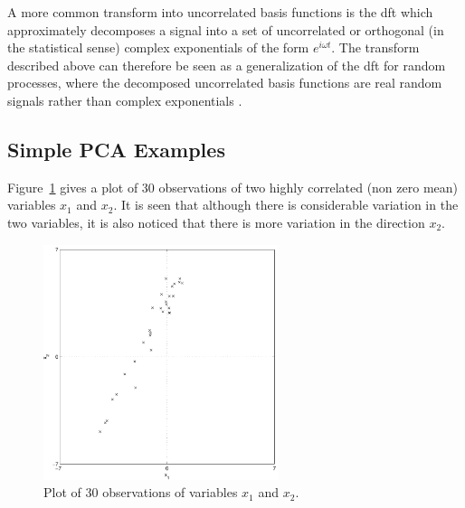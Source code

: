 A more common transform into uncorrelated basis functions is the \DIFdelbegin {}\DIFdelend \DIFaddbegin \gls{dft} \DIFaddend which approximately decomposes a signal into a set of uncorrelated or orthogonal (in the statistical sense) complex exponentials of the form $e^{i\omega t}$. The transform described above can therefore be seen as a generalization of the \DIFdelbegin {}\DIFdelend \DIFaddbegin \gls{dft} \DIFaddend for random processes, where the decomposed uncorrelated basis functions are real random signals rather than complex exponentials \citep[chap. 4.6]{Therrien1992}.

\subsection{Simple PCA Examples}

Figure~\ref{fig:30observations} gives a plot of 30 observations of two highly correlated (non zero mean) variables $x_1$ and $x_2$. It is seen that although there is considerable variation in the two variables, it is also noticed that there is more variation in the direction $x_2$.
\begin{figure}[!]
  \begin{center}
    \includegraphics[width=260px]{30observations.pdf}
    \caption{Plot of 30 observations of variables $x_1$ and $x_2$.}\label{fig:30observations}
  \end{center}
\end{figure}

